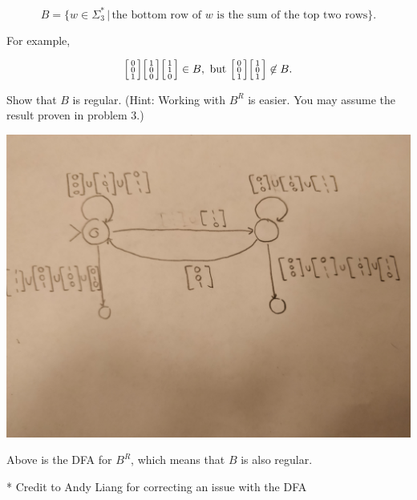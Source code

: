 \documentclass[11pt]{article}
\newenvironment{bsmallmatrix}
  {\left[\begin{smallmatrix}}
  {\end{smallmatrix}\right]}
\begin{document}
\begin{equation*}
  B = \{ w \in \Sigma_3^*\, |\, \mbox{the bottom row of } w \mbox{ is the sum of the top two rows} \}.
\end{equation*}

For example,

\begin{equation*}
  \begin{bsmallmatrix}0\\0\\1\end{bsmallmatrix}
  \begin{bsmallmatrix}1\\0\\0\end{bsmallmatrix}
  \begin{bsmallmatrix}1\\1\\0\end{bsmallmatrix}
  \in B,
  \mbox{ but }
  \begin{bsmallmatrix}0\\0\\1\end{bsmallmatrix}
  \begin{bsmallmatrix}1\\0\\1\end{bsmallmatrix}
  \not \in B.
\end{equation*}

Show that $B$ is regular. (Hint: Working with $B^R$ is easier. You may assume
the result proven in problem 3.)

\includegraphics[scale=0.1]{q4.jpg}

Above is the DFA for $B^R$, which means that $B$ is also regular.

* Credit to Andy Liang for correcting an issue with the DFA
\end{document}
